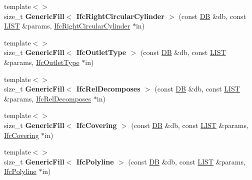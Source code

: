 \begin{DoxyCompactItemize}
\item 
\hypertarget{namespace_assimp_1_1_s_t_e_p_a5d26b54b7676bfc8e6a2b4730388d2d0}{{\footnotesize template$<$$>$ }\\size\+\_\+t {\bfseries Generic\+Fill$<$ Ifc\+Right\+Circular\+Cylinder $>$} (const \hyperlink{class_assimp_1_1_s_t_e_p_1_1_d_b}{D\+B} \&db, const \hyperlink{class_assimp_1_1_s_t_e_p_1_1_e_x_p_r_e_s_s_1_1_l_i_s_t}{L\+I\+S\+T} \&params, \hyperlink{struct_assimp_1_1_i_f_c_1_1_ifc_right_circular_cylinder}{Ifc\+Right\+Circular\+Cylinder} $\ast$in)}\label{namespace_assimp_1_1_s_t_e_p_a5d26b54b7676bfc8e6a2b4730388d2d0}

\item 
\hypertarget{namespace_assimp_1_1_s_t_e_p_ad0749e0a43d15b4b35aa1d3f54974b33}{{\footnotesize template$<$$>$ }\\size\+\_\+t {\bfseries Generic\+Fill$<$ Ifc\+Outlet\+Type $>$} (const \hyperlink{class_assimp_1_1_s_t_e_p_1_1_d_b}{D\+B} \&db, const \hyperlink{class_assimp_1_1_s_t_e_p_1_1_e_x_p_r_e_s_s_1_1_l_i_s_t}{L\+I\+S\+T} \&params, \hyperlink{struct_assimp_1_1_i_f_c_1_1_ifc_outlet_type}{Ifc\+Outlet\+Type} $\ast$in)}\label{namespace_assimp_1_1_s_t_e_p_ad0749e0a43d15b4b35aa1d3f54974b33}

\item 
\hypertarget{namespace_assimp_1_1_s_t_e_p_ae71a908dc08d4b8f32facb9aba7cfbfb}{{\footnotesize template$<$$>$ }\\size\+\_\+t {\bfseries Generic\+Fill$<$ Ifc\+Rel\+Decomposes $>$} (const \hyperlink{class_assimp_1_1_s_t_e_p_1_1_d_b}{D\+B} \&db, const \hyperlink{class_assimp_1_1_s_t_e_p_1_1_e_x_p_r_e_s_s_1_1_l_i_s_t}{L\+I\+S\+T} \&params, \hyperlink{struct_assimp_1_1_i_f_c_1_1_ifc_rel_decomposes}{Ifc\+Rel\+Decomposes} $\ast$in)}\label{namespace_assimp_1_1_s_t_e_p_ae71a908dc08d4b8f32facb9aba7cfbfb}

\item 
\hypertarget{namespace_assimp_1_1_s_t_e_p_acbefbbb020ff75646e6ebd67c66558b0}{{\footnotesize template$<$$>$ }\\size\+\_\+t {\bfseries Generic\+Fill$<$ Ifc\+Covering $>$} (const \hyperlink{class_assimp_1_1_s_t_e_p_1_1_d_b}{D\+B} \&db, const \hyperlink{class_assimp_1_1_s_t_e_p_1_1_e_x_p_r_e_s_s_1_1_l_i_s_t}{L\+I\+S\+T} \&params, \hyperlink{struct_assimp_1_1_i_f_c_1_1_ifc_covering}{Ifc\+Covering} $\ast$in)}\label{namespace_assimp_1_1_s_t_e_p_acbefbbb020ff75646e6ebd67c66558b0}

\item 
\hypertarget{namespace_assimp_1_1_s_t_e_p_aeed3165c0c74f61961561b5bbb4098fd}{{\footnotesize template$<$$>$ }\\size\+\_\+t {\bfseries Generic\+Fill$<$ Ifc\+Polyline $>$} (const \hyperlink{class_assimp_1_1_s_t_e_p_1_1_d_b}{D\+B} \&db, const \hyperlink{class_assimp_1_1_s_t_e_p_1_1_e_x_p_r_e_s_s_1_1_l_i_s_t}{L\+I\+S\+T} \&params, \hyperlink{struct_assimp_1_1_i_f_c_1_1_ifc_polyline}{Ifc\+Polyline} $\ast$in)}\label{namespace_assimp_1_1_s_t_e_p_aeed3165c0c74f61961561b5bbb4098fd}


\end{DoxyCompactItemize}
